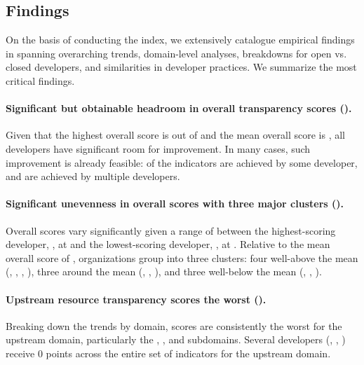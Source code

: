 \hypertarget{findings}{\subsection{Findings}}
\label{sec:findings}

On the basis of conducting the index, we extensively catalogue \numtotalfindings empirical findings in  spanning overarching trends, domain-level analyses, breakdowns for open vs. closed developers, and similarities in developer practices.
We summarize the \numbigfindings most critical findings.

\paragraph{Significant but obtainable headroom in overall transparency scores ().}
Given that the highest overall score is \maxscore out of \numindicators and the mean overall score is \meanscore, all developers have significant room for improvement.
In many cases, such improvement is already feasible: \numfeasible of the indicators are achieved by some developer, and \numfeasiblemultiple are achieved by multiple developers.


\paragraph{Significant unevenness in overall scores with three major clusters ().}
Overall scores vary significantly given a range of \scorerange between the highest-scoring developer, \meta, at \maxscore and the lowest-scoring developer, \amazon, at \minscore. 
Relative to the mean overall score of \meanscore, organizations group into three clusters: four well-above the mean (\meta, \huggingface, \openai, \stability), three around the mean (\google, \anthropic, \cohere), and three well-below the mean (\aitwentyone, \inflection, \amazon).

\paragraph{Upstream resource transparency scores the worst ().}
Breaking down the trends by domain, scores are consistently the worst for the upstream domain, particularly the \data, \labor, and \compute subdomains.
Several developers (\aitwentyone, \inflection, \amazon) receive 0 points across the entire set of \numupstreamindicators indicators for the upstream domain.

